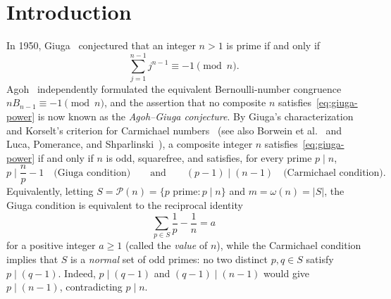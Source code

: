 \documentclass[11pt]{article}
\theoremstyle{remark}
\newcommand{\PP}{\mathcal{P}}
\begin{document}
\section{Introduction}\label{sec:intro}

In 1950, Giuga~\cite{Giuga1950} conjectured that an integer $n > 1$ is prime if
and only if
\begin{equation}\label{eq:giuga-power}
  \sum_{j=1}^{n-1} j^{n-1} \equiv -1 \pmod n.
\end{equation}
Agoh~\cite{Agoh1995} independently formulated the equivalent Bernoulli-number
congruence $n B_{n-1} \equiv -1 \pmod n$, and the assertion that no composite
$n$ satisfies~\eqref{eq:giuga-power} is now known as the \emph{Agoh--Giuga
conjecture}. By Giuga's characterization~\cite{Giuga1950} and Korselt's
criterion for Carmichael numbers~\cite{Korselt1899} (see also Borwein et
al.~\cite{Borwein_1996} and Luca, Pomerance, and
Shparlinski~\cite{LucaPomeranceShparlinski2009}), a composite integer $n$
satisfies~\eqref{eq:giuga-power} if and only if $n$ is odd, squarefree, and
satisfies, for every prime $p \mid n$,
\begin{equation}\label{eq:local}
  p \mid \frac{n}{p} - 1 \quad\text{(Giuga condition)}
  \qquad\text{and}\qquad
  (p - 1) \mid (n - 1) \quad\text{(Carmichael condition)}.
\end{equation}
Equivalently, letting $S = \PP(n) = \{p \text{ prime} : p \mid n\}$ and
$m = \omega(n) = |S|$, the Giuga condition is equivalent to the reciprocal
identity
\begin{equation}\label{eq:recip}
  \sum_{p \in S} \frac{1}{p} - \frac{1}{n} = a
\end{equation}
for a positive integer $a \ge 1$ (called the \emph{value} of $n$), while the
Carmichael condition implies that $S$ is a \emph{normal} set of odd primes: no
two distinct $p, q \in S$ satisfy $p \mid (q - 1)$. Indeed, $p \mid (q - 1)$
and $(q - 1) \mid (n - 1)$ would give $p \mid (n - 1)$, contradicting $p \mid n$.
\end{document}
